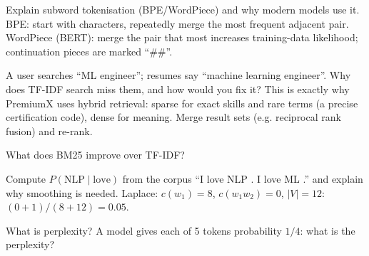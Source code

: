 \begin{qa}{Explain subword tokenisation (BPE/WordPiece) and why modern models use it.}
\why BPE: start with characters, repeatedly merge the most frequent adjacent pair. WordPiece (BERT): merge the pair that most increases training-data likelihood;
continuation pieces are marked ``\#\#''.
\end{qa}

\begin{qa}{\deep A user searches ``ML engineer''; resumes say ``machine learning engineer''. Why does TF-IDF search miss them, and how would you fix it?}
\why This is exactly why PremiumX uses hybrid retrieval: sparse for exact skills and rare terms (a precise certification code), dense for meaning. Merge result
sets (e.g. reciprocal rank fusion) and re-rank.
\end{qa}

\begin{qa}{What does BM25 improve over TF-IDF?}
\end{qa}

\begin{qa}{Compute $P(\text{NLP}\mid\text{love})$ from the corpus ``I love NLP . I love ML .'' and explain why smoothing is needed.}
\worked Laplace: $c(w_1) = 8$, $c(w_1w_2) = 0$, $|V| = 12$: $(0 + 1)/(8 + 12) = 0.05$.
\end{qa}

\begin{qa}{What is perplexity? A model gives each of 5 tokens probability $1/4$: what is the perplexity?}
\end{qa}

